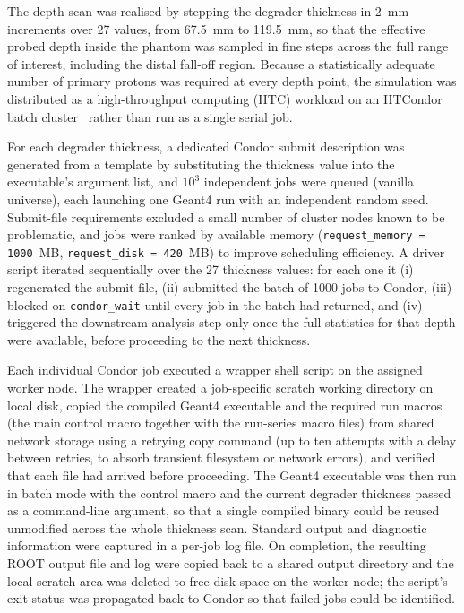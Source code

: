 \documentclass[a4paper]{article}
\begin{document}
The depth scan was realised by stepping the degrader thickness in 2~mm increments over 27 values, from 67.5~mm to 119.5~mm, so that the effective probed depth inside the phantom was sampled in fine steps across the full range of interest, including the distal fall-off region. Because a statistically adequate number of primary protons was required at every depth point, the simulation was distributed as a high-throughput computing (HTC) workload on an HTCondor batch cluster~\cite{condor} rather than run as a single serial job.

For each degrader thickness, a dedicated Condor submit description was generated from a template by substituting the thickness value into the executable's argument list, and $10^3$ independent jobs were queued (vanilla universe), each launching one Geant4 run with an independent random seed. Submit-file requirements excluded a small number of cluster nodes known to be problematic, and jobs were ranked by available memory (\texttt{request\_memory = 1000}~MB, \texttt{request\_disk = 420}~MB) to improve scheduling efficiency. A driver script iterated sequentially over the 27 thickness values: for each one it (i) regenerated the submit file, (ii) submitted the batch of 1000 jobs to Condor, (iii) blocked on \texttt{condor\_wait} until every job in the batch had returned, and (iv) triggered the downstream analysis step only once the full statistics for that depth were available, before proceeding to the next thickness.

Each individual Condor job executed a wrapper shell script on the assigned worker node. The wrapper created a job-specific scratch working directory on local disk, copied the compiled Geant4 executable and the required run macros (the main control macro together with the run-series macro files) from shared network storage using a retrying copy command (up to ten attempts with a delay between retries, to absorb transient filesystem or network errors), and verified that each file had arrived before proceeding. The Geant4 executable was then run in batch mode with the control macro and the current degrader thickness passed as a command-line argument, so that a single compiled binary could be reused unmodified across the whole thickness scan. Standard output and diagnostic information were captured in a per-job log file. On completion, the resulting ROOT output file and log were copied back to a shared output directory and the local scratch area was deleted to free disk space on the worker node; the script's exit status was propagated back to Condor so that failed jobs could be identified.
\end{document}
